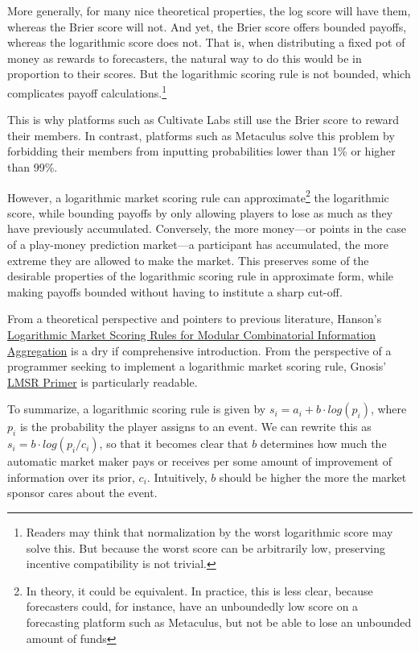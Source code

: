 \documentclass[]{article}
\begin{document}
More generally, for many nice theoretical properties, the log score will
have them, whereas the Brier score will not. And yet, the Brier score
offers bounded payoffs, whereas the logarithmic score does not. That is,
when distributing a fixed pot of money as rewards to forecasters, the
natural way to do this would be in proportion to their scores. But the
logarithmic scoring rule is not bounded, which complicates payoff
calculations.\footnote{Readers may think that normalization by the worst
  logarithmic score may solve this. But because the worst score can be
  arbitrarily low, preserving incentive compatibility is not trivial.}

This is why platforms such as Cultivate Labs still use the Brier score
to reward their members. In contrast, platforms such as Metaculus solve
this problem by forbidding their members from inputting probabilities
lower than 1\% or higher than 99\%.

However, a logarithmic market scoring rule can
approximate\footnote{In theory, it could be equivalent. In practice, this is less clear, because forecasters could, for instance, have an unboundedly low score on a forecasting platform such as Metaculus, but not be able to lose an unbounded amount of funds}
the logarithmic score, while bounding payoffs by only allowing players
to lose as much as they have previously accumulated. Conversely, the
more money---or points in the case of a play-money prediction market---a
participant has accumulated, the more extreme they are allowed to make
the market. This preserves some of the desirable properties of the
logarithmic scoring rule in approximate form, while making payoffs
bounded without having to institute a sharp cut-off.

From a theoretical perspective and pointers to previous literature,
Hanson's \href{https://mason.gmu.edu/~rhanson/mktscore.pdf}{Logarithmic
Market Scoring Rules for Modular Combinatorial Information Aggregation}
is a dry if comprehensive introduction. From the perspective of a
programmer seeking to implement a logarithmic market scoring rule,
Gnosis'
\href{https://gnosis-pm-js.readthedocs.io/en/v1.3.0/lmsr-primer.html}{LMSR
Primer} is particularly readable.

To summarize, a logarithmic scoring rule is given by
\(s_i = a_i + b\cdot log(p_i)\), where \(p_i\) is the probability the
player assigns to an event. We can rewrite this as
\(s_i = b \cdot log(p_i / c_i)\), so that it becomes clear that \(b\)
determines how much the automatic market maker pays or receives per some
amount of improvement of information over its prior, \(c_i\).
Intuitively, \(b\) should be higher the more the market sponsor cares
about the event.
\end{document}
